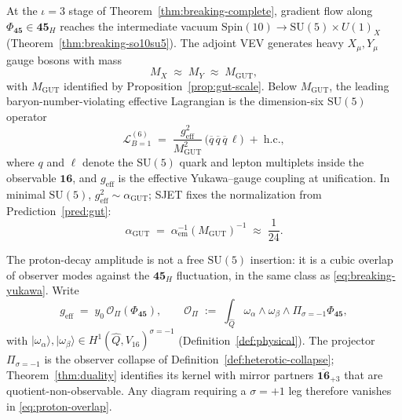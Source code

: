 \documentclass[11pt]{article}
\theoremstyle{plain}
\theoremstyle{definition}
\theoremstyle{remark}
\numberwithin{equation}{section}
\newcommand{\Spin}{\mathrm{Spin}}
\begin{document}
At the $\iota=3$ stage of Theorem~\ref{thm:breaking-complete}, gradient flow
along $\Phi_{\mathbf{45}}\in\mathbf{45}_H$ reaches the intermediate vacuum
$\Spin(10)\to\mathrm{SU}(5)\times U(1)_X$
(Theorem~\ref{thm:breaking-so10su5}). The adjoint VEV generates heavy
$X_\mu,Y_\mu$ gauge bosons with mass
\begin{equation}\label{eq:proton-XY-mass}
  M_X \;\approx\; M_Y \;\approx\; M_{\mathrm{GUT}},
\end{equation}
with $M_{\mathrm{GUT}}$ identified by Proposition~\ref{prop:gut-scale}. Below
$M_{\mathrm{GUT}}$, the leading baryon-number-violating effective Lagrangian is
the dimension-six $\mathrm{SU}(5)$ operator
\begin{equation}\label{eq:proton-dim6}
  \mathcal{L}_{B=1}^{(6)}
  \;=\;
  \frac{g_{\mathrm{eff}}^{2}}{M_{\mathrm{GUT}}^{2}}\,
  \bigl(\overline{q}\,\overline{q}\,\overline{q}\,\ell\bigr)
  \;+\;\mathrm{h.c.},
\end{equation}
where $q$ and $\ell$ denote the $\mathrm{SU}(5)$ quark and lepton multiplets
inside the observable $\mathbf{16}$, and $g_{\mathrm{eff}}$ is the effective
Yukawa--gauge coupling at unification. In minimal $\mathrm{SU}(5)$,
$g_{\mathrm{eff}}^{2}\sim\alpha_{\mathrm{GUT}}$; SJET fixes the normalization
from Prediction~\ref{pred:gut}:
\begin{equation}\label{eq:alpha-gut}
  \alpha_{\mathrm{GUT}}
  \;=\;
  \alpha_{\mathrm{em}}^{-1}(M_{\mathrm{GUT}})^{-1}
  \;\approx\;
  \frac{1}{24}.
\end{equation}

The proton-decay amplitude is not a free $\mathrm{SU}(5)$ insertion: it is a
cubic overlap of observer modes against the $\mathbf{45}_H$ fluctuation, in
the same class as \eqref{eq:breaking-yukawa}. Write
\begin{equation}\label{eq:proton-overlap}
  g_{\mathrm{eff}}
  \;=\;
  y_0\,
  \mathcal{O}_{\Pi}\!\left(\Phi_{\mathbf{45}}\right),
  \qquad
  \mathcal{O}_{\Pi}
  \;:=\;
  \int_{\hat Q}
  \omega_\alpha \wedge \omega_\beta \wedge \Pi_{\sigma=-1}\Phi_{\mathbf{45}},
\end{equation}
with $|\omega_\alpha\rangle,|\omega_\beta\rangle\in
H^1(\hat Q,V_{16})^{\sigma=-1}$ (Definition~\ref{def:physical}). The projector
$\Pi_{\sigma=-1}$ is the observer collapse of
Definition~\ref{def:heterotic-collapse}; Theorem~\ref{thm:duality} identifies
its kernel with mirror partners $\overline{\mathbf{16}}_{+3}$ that are
quotient-non-observable. Any diagram requiring a $\sigma=+1$ leg therefore
vanishes in \eqref{eq:proton-overlap}.
\end{document}
